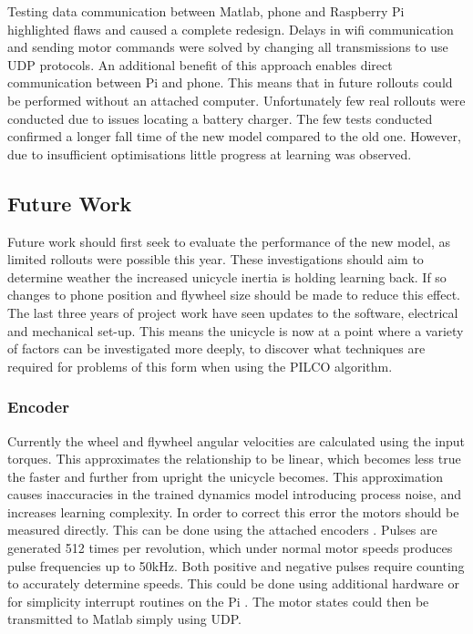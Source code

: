 \documentclass[twoside,twocolumn,12pt]{article}
\begin{document}
\newline
Testing data communication between Matlab, phone and Raspberry Pi highlighted flaws and caused a complete redesign. Delays in wifi communication and sending motor commands were solved by changing all transmissions to use UDP protocols. An additional benefit of this approach enables direct communication between Pi and phone. This means that in future rollouts could be performed without an attached computer.
\newline
Unfortunately few real rollouts were conducted due to issues locating a battery charger. The few tests conducted confirmed a longer fall time of the new model compared to the old one. However, due to insufficient optimisations little progress at learning was observed. 


\subsection{Future Work}
Future work should first seek to evaluate the performance of the new model, as limited rollouts were possible this year. These investigations should aim to determine weather the increased unicycle inertia is holding learning back. If so changes to phone position and flywheel size should be made to reduce this effect.
\newline
The last three years of project work have seen updates to the software, electrical and mechanical set-up. This means the unicycle is now at a point where a variety of factors can be investigated more deeply, to discover what techniques are required for problems of this form when using the PILCO algorithm. 
\subsubsection{Encoder}
Currently the wheel and flywheel angular velocities are calculated using the input torques. This approximates the relationship to be linear, which becomes less true the faster and further from upright the unicycle becomes. This approximation causes inaccuracies in the trained dynamics model introducing process noise, and increases learning complexity. 
\newline
In order to correct this error the motors should be measured directly. This can be done using the attached encoders \cite{encoder}. Pulses are generated 512 times per revolution, which under normal motor speeds produces pulse frequencies up to 50kHz.
\newline
Both positive and negative pulses require counting to accurately determine speeds. This could be done using additional hardware or for simplicity interrupt routines on the Pi \cite{interrupt}. The motor states could then be transmitted to Matlab simply using UDP.
\end{document}
